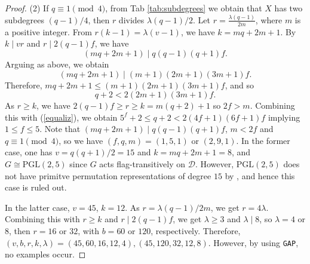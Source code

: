 \documentclass[a4paper,twopage,reqno,12pt]{amsart}
\theoremstyle{definition}
\numberwithin{equation}{section}
\newcommand{\PGL}{\mathrm{PGL}}
\renewcommand{\leq}{\leqslant}
\renewcommand{\geq}{\geqslant}
\begin{document}
\begin{proof}
(2) If $q\equiv 1 \pmod{4}$, from Tab \ref{tab:subdegrees} we obtain that $X$ has two subdegrees $(q-1)/4$, 
then $r$ divides $\lambda(q-1)/2$. Let $r=\frac{\lambda(q-1)}{2m}$, where $m$ is a positive integer.
From $r(k-1)=\lambda(v-1)$, we have $k=mq+2m+1$.
By $k\mid vr$ and $r\mid 2(q-1)f$,  we have 
\[
(mq+2m+1)\mid q(q-1)(q+1)f.
\]
Arguing as above, we obtain 
$$(mq+2m+1) \mid (m+1)(2m+1)(3m+1)f\text{.}$$
Therefore, $mq+2m+1 \leq (m+1)(2m+1)(3m+1)f$, and so  
\begin{equation}\label{equaliz}
q+2 <2(2m+1)(3m+1)f\text{.}    
\end{equation}
As $r\geq k$, we have
$2(q-1)f\geq r \geq k=m(q+2)+1$ so  
$2f>m.$
Combining this with (\ref{equaliz}), we obtain $5^{f}+2 \leq q+2 <2(4f+1)(6f+1)f$
implying $1\le f\le 5$.
Note that $(mq+2m+1)\mid q(q-1)(q+1)f$, $m<2f$ and $q\equiv 1 \pmod 4$,  
so we have $(f,q,m)=(1,5,1)$ or $(2,9,1)$.
In the former case, one has $v=q(q+1)/2=15$ and $k=mq+2m+1=8$, and $G \cong \PGL(2,5)$ since $G$ acts flag-transitively on $\mathcal{D}$. However, $\PGL(2,5)$ does not have primitve permutation representations of degree $15$ by \cite{At}, and hence this case is ruled out.

In the latter case, $v=45$, $k=12$.
As $r=\lambda (q-1)/2m$, we get $r=4\lambda$.
Combining this with $r\ge k$ and $r\mid 2(q-1)f$, we get $\lambda \ge3$ and $\lambda\mid 8$,
so $\lambda =4$ or $8$, then $r=16$ or $32$, with $b=60$ or $120$, respectively.
Therefore, $(v,b,r,k,\lambda)=(45,60,16,12,4), (45,120,32,12,8)$. However, by using \texttt{GAP}, no examples occur.



\end{proof}
\end{document}
